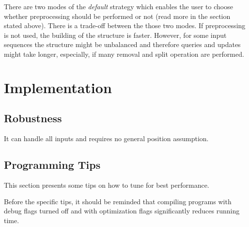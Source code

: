 There are two modes of the {\it default\/} strategy which enables the user
to choose whether preprocessing should be performed or not (read more in
the section stated above).
There is a trade-off between the those two modes. If
preprocessing is not used, the building of the structure is faster. However,
for some input sequences the structure might be unbalanced and therefore 
queries and updates might take longer, especially, if many removal and split 
operation are performed.

\section*{Implementation}
\subsection*{Robustness}
It can handle all inputs and requires no general position assumption.
\subsection*{Programming Tips}
This section presents some tips on how to tune
 for best performance.

Before the specific tips, it should be reminded that compiling
programs with debug flags turned off and with optimization flags
significantly reduces running time.

